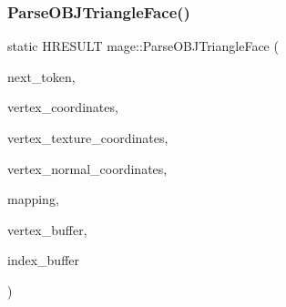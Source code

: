 \hypertarget{namespacemage_abe5e11d703a5072ec7d0f71816d3dcaa}{}\label{namespacemage_abe5e11d703a5072ec7d0f71816d3dcaa} 
\subsubsection{\texorpdfstring{Parse\+O\+B\+J\+Triangle\+Face()}{ParseOBJTriangleFace()}\hspace{0.1cm}{\footnotesize\ttfamily [1/2]}}
{\footnotesize\ttfamily static H\+R\+E\+S\+U\+LT mage\+::\+Parse\+O\+B\+J\+Triangle\+Face (\begin{DoxyParamCaption}\item[{char $\ast$$\ast$}]{next\+\_\+token,  }\item[{vector$<$ \hyperlink{structmage_1_1_point3}{Point3} $>$ \&}]{vertex\+\_\+coordinates,  }\item[{vector$<$ X\+M\+F\+L\+O\+A\+T2 $>$ \&}]{vertex\+\_\+texture\+\_\+coordinates,  }\item[{vector$<$ \hyperlink{structmage_1_1_normal3}{Normal3} $>$ \&}]{vertex\+\_\+normal\+\_\+coordinates,  }\item[{map$<$ X\+M\+U\+I\+N\+T3, uint32\+\_\+t, \hyperlink{structmage_1_1_o_b_j_comparator_x_m_u_i_n_t3}{O\+B\+J\+Comparator\+X\+M\+U\+I\+N\+T3} $>$ \&}]{mapping,  }\item[{vector$<$ \hyperlink{structmage_1_1_vertex}{Vertex} $>$ \&}]{vertex\+\_\+buffer,  }\item[{vector$<$ uint32\+\_\+t $>$ \&}]{index\+\_\+buffer }\end{DoxyParamCaption})\hspace{0.3cm}{\ttfamily [static]}}

\hypertarget{namespacemage_a01b99a3a155f202bf3b2b84522d223c8}{}\label{namespacemage_a01b99a3a155f202bf3b2b84522d223c8} 
